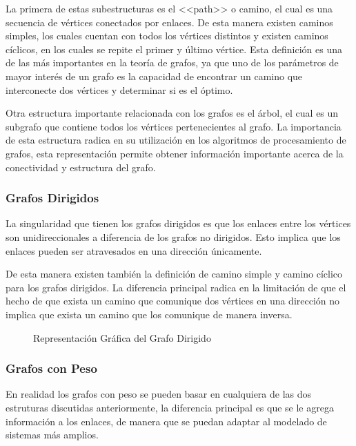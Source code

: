 \documentclass[a4paper, 11pt]{report}
\newcommand{\DrawGraph}[5]{

    \begin{scope}[#4]
    \foreach \pos/\nodo in {{(0,0)/1}, {(2,1)/2}, {(4,1)/3}, {(0,2)/4}, {(3,0)/5}, {(2,-1)/6}, {(4,-1)/7}}
        \node[vertex] (#3\nodo) at \pos {\nodo};

    \foreach \start/\end in {1/4, 1/2, 1/6,2/5,2/3,2/6,5/7,3/7,4/2,6/7}
        \path[edge,#5] (#3\start) -- (#3\end);

    \foreach \nodo in {#1}
        \node[selected vertex] at (#3\nodo) {\nodo};
        

    \begin{pgfonlayer}{background}
        \foreach \start/\end in {#2}
            \path[selected edge,#5] (#3\start) -- (#3\end);
    \end{pgfonlayer}
    \end{scope}
}
\newcommand{\Deactivate}{\shorthandoff{<>."}}
\newcommand{\Activate}{\shorthandon{<>."}}
\begin{document}
La primera de estas subestructuras es el <<path>> o camino, el cual es una secuencia de v\'ertices conectados por enlaces. De esta manera existen caminos simples, los cuales cuentan con todos los v\'ertices distintos y existen caminos c\'iclicos, en los cuales se repite el primer y \'ultimo v\'ertice. Esta definici\'on es una de las m\'as importantes en la teor\'ia de grafos, ya que uno de los par\'ametros de mayor inter\'es de un grafo es la capacidad de encontrar un camino que interconecte dos v\'ertices y determinar si es el \'optimo.

Otra estructura importante relacionada con los grafos es el \'arbol, el cual es un subgrafo que contiene todos los v\'ertices pertenecientes al grafo. La importancia de esta estructura radica en su utilizaci\'on en los algoritmos de procesamiento de grafos, esta representaci\'on permite obtener informaci\'on importante acerca de la conectividad y estructura del grafo.

\subsubsection{Grafos Dirigidos}
La singularidad que tienen los grafos dirigidos es que los enlaces entre los v\'ertices son unidireccionales a diferencia de los grafos no dirigidos. Esto implica que los enlaces pueden ser atravesados en una direcci\'on \'unicamente.

De esta manera existen tambi\'en la definici\'on de camino simple y camino c\'iclico para los grafos dirigidos. La diferencia principal radica en la limitaci\'on de que el hecho de que exista un camino que comunique dos v\'ertices en una direcci\'on no implica que exista un camino que los comunique de manera inversa.

\begin{figure}[!h]
    \centering
    \Deactivate
    \Activate
    \caption{Representaci\'on Gr\'afica del Grafo Dirigido}
    \label{EjGrafoDirigido}
\end{figure}

\subsubsection{Grafos con Peso}
En realidad los grafos con peso se pueden basar en cualquiera de las dos estruturas discutidas anteriormente, la diferencia principal es que se le agrega informaci\'on a los enlaces, de manera que se puedan adaptar al modelado de sistemas m\'as amplios.
\end{document}
